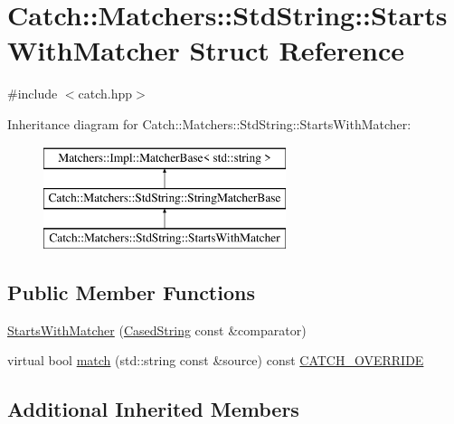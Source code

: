\hypertarget{structCatch_1_1Matchers_1_1StdString_1_1StartsWithMatcher}{\section{Catch\-:\-:Matchers\-:\-:Std\-String\-:\-:Starts\-With\-Matcher Struct Reference}
\label{structCatch_1_1Matchers_1_1StdString_1_1StartsWithMatcher}
}


{\ttfamily \#include $<$catch.\-hpp$>$}

Inheritance diagram for Catch\-:\-:Matchers\-:\-:Std\-String\-:\-:Starts\-With\-Matcher\-:\begin{figure}[H]
\begin{center}
\leavevmode
\includegraphics[height=3.000000cm]{structCatch_1_1Matchers_1_1StdString_1_1StartsWithMatcher}
\end{center}
\end{figure}
\subsection*{Public Member Functions}
\begin{DoxyCompactItemize}
\item 
\hyperlink{structCatch_1_1Matchers_1_1StdString_1_1StartsWithMatcher_a7b86f258bdbd131a6e7bcd94a8977325}{Starts\-With\-Matcher} (\hyperlink{structCatch_1_1Matchers_1_1StdString_1_1CasedString}{Cased\-String} const \&comparator)
\item 
virtual bool \hyperlink{structCatch_1_1Matchers_1_1StdString_1_1StartsWithMatcher_a0d37b1ddba7f1031e360ccd475f05d0d}{match} (std\-::string const \&source) const \hyperlink{catch_8hpp_a8ecdce4d3f57835f707915ae831eb847}{C\-A\-T\-C\-H\-\_\-\-O\-V\-E\-R\-R\-I\-D\-E}
\end{DoxyCompactItemize}
\subsection*{Additional Inherited Members}


